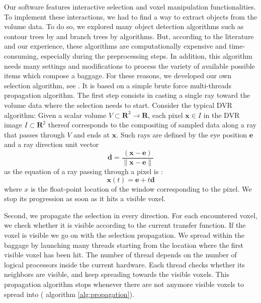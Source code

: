 Our software features interactive selection and voxel manipulation functionalities. To implement these interactions, we had to find a way to extract objects from the volume data. To do so, we explored many object detection algorithms such as contour trees by \cite{carr_computing_2000} and branch trees by \cite{pascucci_multi-resolution_2004} algorithms. But, according to the literature and our experience, these algorithms are computationally expensive and time-consuming, especially during the preprocessing steps. In addition, this algorithm needs many settings and modifications to process the variety of available possible items which compose a baggage. For these reasons, we developed our own selection algorithm, see \cite{hurter2017object}. It is based on a simple brute force multi-threads propagation algorithm. The first step consists in casting a single ray toward the volume data where the selection needs to start.
Consider the typical DVR algorithm: Given a scalar volume $V \subset \mathbf{R}^3 \rightarrow \mathbf{R}$, each pixel $\mathbf{x} \in I$ in the DVR image $I \subset \mathbf{R}^2$ thereof corresponds to the compositing of sampled data along a ray that passes through $V$ and ends at $\mathbf{x}$. Such rays are defined by the eye position $\mathbf{e}$ and a ray direction unit vector
\begin{equation}
\mathbf{d} = \frac{ (\mathbf{x} - \mathbf{e}) }{ \| \mathbf{x} - \mathbf{e} \| }
\end{equation}
as the equation of a ray passing through a pixel is :
\begin{equation}
\mathbf{x}(t) =  \mathbf{e} + t\mathbf{d}
\end{equation}
where $x$ is the float-point location of the window corresponding to the pixel.
 We stop its progression as soon as it hits a visible voxel.



Second, we propagate the selection in every direction. For each encountered voxel, we check whether it is visible according to the current transfer function. If the voxel is visible we go on with the selection propagation. We spread within the baggage by launching many threads starting from the location where the first visible voxel has been hit. The number of thread depends on the number of logical processors inside the current hardware. Each thread checks whether its neighbors are visible, and keep spreading towards the visible voxels. This propagation algorithm stops whenever there are not anymore visible voxels to spread into ( algorithm \autoref{alg:propagation}).

